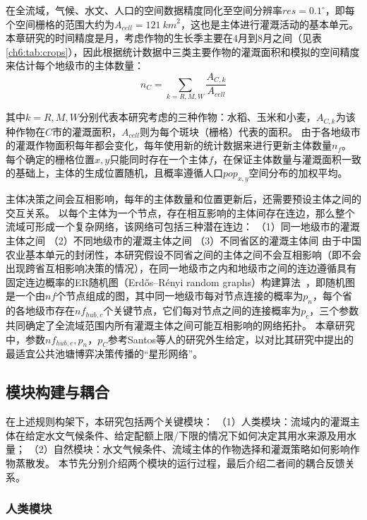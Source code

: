 在全流域，气候、水文、人口的空间数据精度同化至空间分辨率$res = 0.1^{\circ}$，即每个空间栅格的范围大约为$A_{cell} = 121~{km}^2$，这也是主体进行灌溉活动的基本单元。
本章研究的时间精度是月，考虑作物的生长季主要在$4$月到$8$月之间（见表\ref{ch6:tab:crops}），因此根据统计数据中三类主要作物的灌溉面积和模拟的空间精度来估计每个地级市的主体数量：
\begin{equation}
    n_{C} = \sum_{k=R, M, W}\frac{A_{C, k}}{A_{cell}}
\end{equation}

其中$k = R, M, W$分别代表本研究考虑的三种作物：水稻、玉米和小麦，$A_{C, k}$为该种作物在$C$市的灌溉面积，$A_{cell}$则为每个斑块（栅格）代表的面积。
由于各地级市的灌溉作物面积每年都会变化，每年使用新的统计数据来进行更新主体数量$n_f$。
每个确定的栅格位置$x, y$只能同时存在一个主体$f$，在保证主体数量与灌溉面积一致的基础上，主体的生成位置随机，且概率遵循人口$pop_{x, y}$空间分布的加权平均。

主体决策之间会互相影响，每年的主体数量和位置更新后，还需要预设主体之间的交互关系。
以每个主体为一个节点，存在相互影响的主体间存在连边，那么整个流域可形成一个复杂网络，该网络可包括三种潜在连边：
（1）同一地级市的灌溉主体之间
（2）不同地级市的灌溉主体之间
（3）不同省区的灌溉主体间
由于中国农业基本单元的封闭性，本研究假设不同省之间的主体之间不会互相影响（即不会出现跨省互相影响决策的情况），在同一地级市之内和地级市之间的连边遵循具有固定连边概率的ER随机图（Erdős–Rényi random graphs）构建算法~\cite{maier2019}，即随机图是一个由$nf$个节点组成的图，其中同一地级市每对节点连接的概率为$p_n$，每个省的各地级市存在$nf_{hub, c}$个关键节点，它们每对节点之间的连接概率为$p_c$，三个参数共同确定了全流域范围内所有灌溉主体之间可能互相影响的网络拓扑。
本章研究中，参数$nf_{hub, c}, p_n$，$p_C$参考Santos等人的研究外生给定\cite{santos2008}，以对比其研究中提出的最适宜公共池塘博弈决策传播的“星形网络”。



\subsection{模块构建与耦合}

在上述规则构架下，本研究包括两个关键模块：
（1）人类模块：流域内的灌溉主体在给定水文气候条件、给定配额上限/下限的情况下如何决定其用水来源及用水量；
（2）自然模块：水文气候条件、流域主体的作物选择和灌溉策略如何影响作物蒸散发。
本节先分别介绍两个模块的运行过程，最后介绍二者间的耦合反馈关系。

\subsubsection{人类模块}\label{ch6:sec:society}

